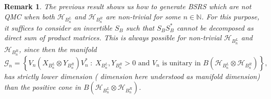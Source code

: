 \documentclass[11pt]{article}
\theoremstyle{newdefinition}
\theoremstyle{newplain}
\newtheorem{theorem}[definition]{Theorem}
\newtheorem{remark}[definition]{Remark}
\theoremstyle{myplain}
\DeclareMathOperator{\1}{\mathds{1}}
\newcommand{\PCR}[1]{{\color{blue}#1}}
\begin{document}
\PCR{
\begin{remark}
    The previous result shows us how to generate BSRS which are not QMC when  both $\mathcal{H}_{B_n^L}$ and $\mathcal{H}_{B_n^R}$ are non-trivial for some $n \in \mathbb{N}$. For this purpose, it suffices to consider an invertible $S_B$ such that $S_BS_B^*$ cannot be decomposed as direct sum of product matrices. This is always possible for non-trivial $\mathcal{H}_{B_n^L}$ and $\mathcal{H}_{B_n^R}$, since then the  manifold
    \begin{equation}
        \mathcal{G}_n=\left\{ V_n (X_{B_n^L} \otimes Y_{B_n^R}) V_n^* \hspace{3pt}:  \hspace{3pt} X_{B_n^L}, Y_{B_n^R}>0 \text{ and } V_n \text{ is unitary in } B(\mathcal{H}_{B_n^L} \otimes \mathcal{H}_{B_n^R})\right\},
    \end{equation}
    has strictly lower dimension ( dimension here understood as manifold dimension) than the positive cone in $B(\mathcal{H}_{B_n^L}\otimes \mathcal{H}_{B_n^R})$.
\end{remark}
}

\begin{comment}
\begin{theorem}\label{rem:measure}
    The set of quantum Markov chains has measure  zero on the  set of  BS recovery states, understanding the volume as the measure.
\end{theorem}
We turn now on the structure of the manifold of QMC and compare it with the structure of BSRS. Separate the set of QMC in two disjoint sets
\begin{equation}
    QMC=\mathcal{F}_1\cup \mathcal{F}_2,
\end{equation}
where
\begin{multline}
    \mathcal{F}_1=\Biggl\{ \rho_{ABC}: \text{ there exists a unitary }U_B \text{ and } m\in \mathbb{N} \text{ such that } d_{B_m^L}\neq 1 \text{ and } d_{B_m^RC}\neq 1  \\ \left. \text{ satisfying }  \rho_{ABC}=U_B\left(\bigoplus_{n=1}^N p_n \rho_{AB_n^L}\otimes \rho_{B_n^RC}\right)U_B^*  \right\}. 
\end{multline}
and $\mathcal{F}_2=QMC\setminus \mathcal{F}_1$. If we let $T_{AC}=\tr_{AC}$, the elements of $T_{AC}(\mathcal{F}_1)$ will satisfy
\begin{equation}
    \rho_B=U_B\left(\bigoplus_{n=1}^N p_n \rho_{B_n^L}\otimes \rho_{B_n^R}\right)U_B^* =U_B\left(\bigoplus_{n=1}^N p_n S_{B_n^L}S_{B_n^L}^*\otimes S_{B_n^R}S_{B_n^R}^*\right)U_B^*, 
\end{equation}
Now, for the sector $m$, $S_{B_m}S_{B_m}^*$ is unitarily equivalent to a product matrix, which has strictly lower dimension ( dimension here understood as manifold dimension) than the positive cone in $L(\mathcal{H}_{B_m^L}\otimes \mathcal{H}_{B_m^R})$. As a consequence, 
\end{comment}
\end{document}
